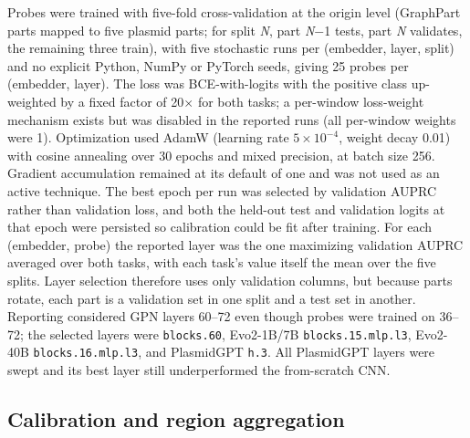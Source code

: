 Probes were trained with five-fold cross-validation at the origin level
(GraphPart parts mapped to five plasmid parts; for split \emph{N}, part
\emph{N}$-$1 tests, part \emph{N} validates, the remaining three train), with
five stochastic runs per (embedder, layer, split) and no explicit Python,
NumPy or PyTorch seeds, giving 25 probes per (embedder, layer). The loss was
BCE-with-logits with the positive class up-weighted by a fixed factor of
20$\times$ for both tasks; a per-window loss-weight mechanism exists but was
disabled in the reported runs (all per-window weights were 1). Optimization
used AdamW \cite{loshchilov2019adamw} (learning rate $5\times10^{-4}$, weight decay 0.01) with cosine annealing
over 30 epochs and mixed precision, at batch size 256. Gradient accumulation
remained at its default of one and was not used as an active technique. The
best epoch per run was selected by validation AUPRC rather than validation
loss, and both the held-out test and validation logits at that epoch were
persisted so calibration could be fit after training. For each (embedder,
probe) the reported layer was the one maximizing validation AUPRC averaged
over both tasks, with each task's value itself the mean over the five splits.
Layer selection therefore uses only validation columns, but because parts
rotate, each part is a validation set in one split and a test set in another.
Reporting considered GPN layers 60--72 even though probes were trained on
36--72; the selected layers were \model \texttt{blocks.60}, Evo2-1B/7B
\texttt{blocks.15.mlp.l3}, Evo2-40B \texttt{blocks.16.mlp.l3}, and PlasmidGPT
\texttt{h.3}. All PlasmidGPT layers were swept and its best layer still
underperformed the from-scratch CNN.

\subsection*{Calibration and region aggregation}

